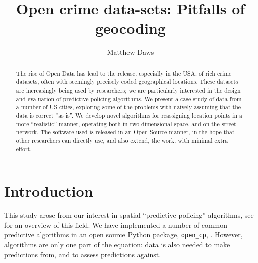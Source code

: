 \documentclass[twoside,a4paper,twocolumn,10pt]{article}
\theoremstyle{plain}
\theoremstyle{definition}
\begin{document}
\title{Open crime data-sets: Pitfalls of geocoding}
\author{Matthew Daws}
\maketitle

\begin{abstract}
The rise of Open Data has lead to the release, especially in the USA, of rich
crime datasets, often with seemingly precisely coded geographical locations.
These datasets are increasingly being used by researchers; we are particularly
interested in the design and evaluation of predictive policing algorithms.
We present a case study of data from a number of US cities, exploring some of
the problems with naively assuming that the data is correct ``as is''.  We develop
novel algorithms for reassigning location points in a more ``realistic'' manner,
operating both in two dimensional space, and on the street network.
The software used is released in an Open Source manner,
in the hope that other researchers can directly use, and also extend, the work,
with minimal extra effort.
\end{abstract}


\section{Introduction}

This study arose from our interest in spatial ``predictive policing'' algorithms,
see \cite{rand} for an overview of this field.  We have implemented a number of
common predictive algorithms in an open source Python package,
\texttt{open\_cp}, \cite{opencp}.
However, algorithms are only one part of the equation: data is also needed to make
predictions from, and to assess predictions against.
\end{document}
